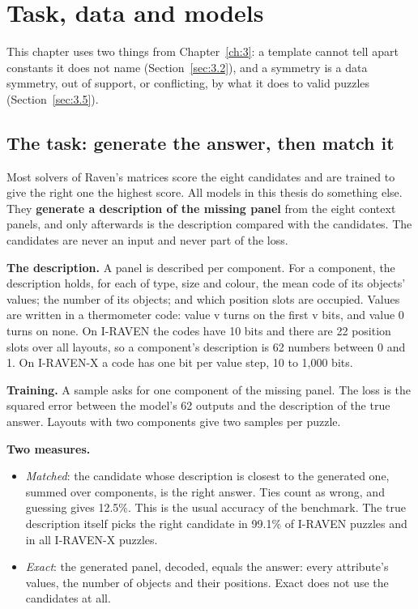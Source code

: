 \chapter{Task, data and models}\label{ch:4}

This chapter uses two things from Chapter~\ref{ch:3}: a template cannot tell apart constants it does not name (Section~\ref{sec:3.2}), and a symmetry is a data symmetry, out of support, or conflicting, by what it does to valid puzzles (Section~\ref{sec:3.5}).

\section{The task: generate the answer, then match it}\label{sec:4.1}

Most solvers of Raven's matrices score the eight candidates and are trained to give the right one the highest score. All models in this thesis do something else. They \textbf{generate a description of the missing panel} from the eight context panels, and only afterwards is the description compared with the candidates. The candidates are never an input and never part of the loss.

\textbf{The description.} A panel is described per component. For a component, the description holds, for each of type, size and colour, the mean code of its objects' values; the number of its objects; and which position slots are occupied. Values are written in a thermometer code: value v turns on the first v bits, and value 0 turns on none. On I-RAVEN the codes have 10 bits and there are 22 position slots over all layouts, so a component's description is 62 numbers between 0 and 1. On I-RAVEN-X a code has one bit per value step, 10 to 1,000 bits.

\textbf{Training.} A sample asks for one component of the missing panel. The loss is the squared error between the model's 62 outputs and the description of the true answer. Layouts with two components give two samples per puzzle.

\textbf{Two measures.}

\begin{itemize}
\item \emph{Matched}: the candidate whose description is closest to the generated one, summed over components, is the right answer. Ties count as wrong, and guessing gives 12.5\%. This is the usual accuracy of the benchmark. The true description itself picks the right candidate in 99.1\% of I-RAVEN puzzles and in all I-RAVEN-X puzzles.
\item \emph{Exact}: the generated panel, decoded, equals the answer: every attribute's values, the number of objects and their positions. Exact does not use the candidates at all.
\end{itemize}

